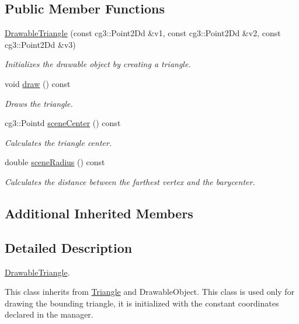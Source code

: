\subsection*{Public Member Functions}
\begin{DoxyCompactItemize}
\item 
\hyperlink{classDrawableTriangle_ae35494dd883c6248a2128b7fd931b4ab}{Drawable\+Triangle} (const cg3\+::\+Point2\+Dd \&v1, const cg3\+::\+Point2\+Dd \&v2, const cg3\+::\+Point2\+Dd \&v3)
\begin{DoxyCompactList}\small\item\em Initializes the drawable object by creating a triangle. \end{DoxyCompactList}\item 
\mbox{\label{classDrawableTriangle_a732e29812f4283029b532bbd7ccc23a0}} 
void \hyperlink{classDrawableTriangle_a732e29812f4283029b532bbd7ccc23a0}{draw} () const
\begin{DoxyCompactList}\small\item\em Draws the triangle. \end{DoxyCompactList}\item 
cg3\+::\+Pointd \hyperlink{classDrawableTriangle_a751976132aa5057995dfd42cc48c7c56}{scene\+Center} () const
\begin{DoxyCompactList}\small\item\em Calculates the triangle center. \end{DoxyCompactList}\item 
double \hyperlink{classDrawableTriangle_a2eed49d841204c4925ef7fcadba4e8f4}{scene\+Radius} () const
\begin{DoxyCompactList}\small\item\em Calculates the distance between the farthest vertex and the barycenter. \end{DoxyCompactList}\end{DoxyCompactItemize}
\subsection*{Additional Inherited Members}


\subsection{Detailed Description}
\hyperlink{classDrawableTriangle}{Drawable\+Triangle}. 

This class inherits from \hyperlink{classTriangle}{Triangle} and Drawable\+Object. This class is used only for drawing the bounding triangle, it is initialized with the constant coordinates declared in the manager. 

